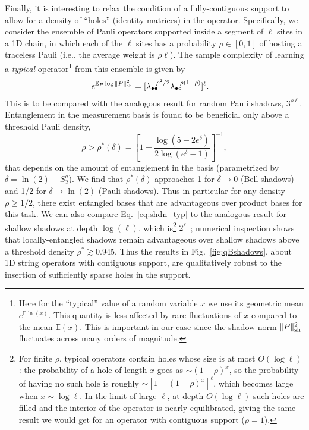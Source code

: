 \documentclass[a4paper,twocolumns,11pt,accepted=2024-03-04]{quantumarticle}
\newcommand{\shadownorm}[1]{\ensuremath{\| #1 \|_{\rm sh}}}
\begin{document}
Finally, it is interesting to relax the condition of a fully-contiguous support to allow for a density of ``holes'' (identity matrices) in the operator. Specifically, we consider the ensemble of Pauli operators supported inside a segment of $\ell$ sites in a 1D chain, in which each of the $\ell$ sites has a probability $\rho\in[0,1]$ of hosting a traceless Pauli (i.e., the average weight is $\rho\ell$). The sample complexity of learning a {\it typical} operator\footnote{Here for the ``typical'' value of a random variable $x$ we use its geometric mean $e^{\mathbb{E} \ln(x)}$. This quantity is less affected by rare fluctuations of $x$ compared to the mean $\mathbb{E}(x)$. This is important in our case since the shadow norm $\shadownorm{P}^2$ fluctuates across many orders of magnitude.} from this ensemble is given by
\begin{align}
e^{\mathbb{E}_P \log \shadownorm{P}^2} 
& = [\lambda_{\bullet\bullet}^{-\rho^2/2} \lambda_{\bullet\circ}^{-\rho(1-\rho)}]^\ell . \label{eq:shdn_typ}
\end{align}
This is to be compared with the analogous result for random Pauli shadows, $3^{\rho \ell}$. Entanglement in the measurement basis is found to be beneficial only above a threshold Pauli density,
\begin{equation}
\rho > \rho^\ast(\delta) = \left[ 1 - \frac{\log(5-2e^\delta)}{2\log(e^\delta-1)} \right]^{-1},
\end{equation}
that depends on the amount of entanglement in the basis (parametrized by $\delta = \ln(2)-S_2^a$).
We find that $\rho^\ast(\delta)$ approaches 1 for $\delta\to0$ (Bell shadows) and 1/2 for $\delta\to\ln(2)$ (Pauli shadows). Thus in particular for any density $\rho \geq 1/2$, there exist entangled bases that are advantageous over product bases for this task.
We can also compare Eq.~\eqref{eq:shdn_typ} to the analogous result for shallow shadows at depth $\log(\ell)$, which is\footnote{For finite $\rho$, typical operators contain holes whose size is at most $O(\log \ell)$: the probability of a hole of length $x$ goes as $\sim (1-\rho)^x$, so the probability of having no such hole is roughly $\sim [1-(1-\rho)^x]^\ell$, which becomes large when $x \sim \log \ell$. In the limit of large $\ell$, at depth $O(\log \ell)$ such holes are filled and the interior of the operator is nearly equilibrated, giving the same result we would get for an operator with contiguous support ($\rho=1$).} $2^\ell$~\cite{ippoliti_operator_2023}; numerical inspection shows that locally-entangled shadows remain advantageous over shallow shadows above a threshold density $\rho^\ast \gtrsim 0.945$. 
Thus the results in Fig.~\ref{fig:qBshadows}, about 1D string operators with contiguous support, are qualitatively robust to the insertion of sufficiently sparse holes in the support.
\end{document}
